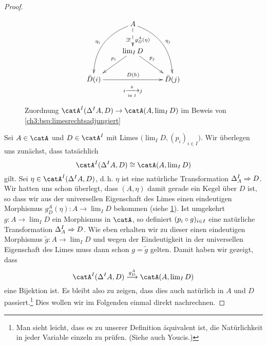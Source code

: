 \begin{proof}
    \let\origlim=\lim
    \renewcommand{\lim}{\origlim\nolimits}
    \begin{figure}
        \centering
        \begin{equation*}
                \xymatrix{
                    & \ar@/_1.5pc/[ddl]_{\eta_i} 
                    A \ar@/^1.5pc/[ddr]^{\eta_j} 
                    \ar@{-->}[d]_(.57){\exists!}^(.57){g_D^A(\eta)} &
                    \\
                    & \ar[dl]_(.4){p_i} \lim_I D 
                      \ar[dr]^(.4){p_j} &
                    \\
                    \bar D(i) \ar[rr]^{D(h)}
                    \ar@{}@<-16pt>[rr]|-{i \xrightarrow[\text{in $I$}]{h} j}
                    & & \bar D(j)
                }
        \end{equation*}
        \caption{Zuordnung $\catA^I(\Delta^I A, D) \to \catA(A,\lim_I D)$ im
            Beweis von \cref{ch3:bsp:limesrechtsadjungiert}}
        \label{ch3:fig:nattrafozumorphismus}
    \end{figure}
    Sei $A\in\catA$ und $D\in\catA^I$ mit Limes $\bigl(\lim_I D,(p_i)_{i\in I}\bigr)$.
    Wir überlegen uns zunächst, dass tatsächlich
    \[ \catA^I(\Delta^I A, D) \cong \catA(A,\lim_I D) \]
    gilt. Sei $\eta\in\catA^I(\Delta^I A, D)$, d.\,h. $\eta$ ist eine natürliche
    Transformation $\Delta^I_A\mathrel{\Rightarrow} D$. Wir hatten uns schon überlegt,
    dass $(A,\eta)$ damit gerade ein Kegel über $D$ ist, so dass wir aus der
    universellen Eigenschaft des Limes einen eindeutigen Morphismus
    $g_D^A(\eta)\colon A\to \lim_I D$ bekommen (siehe
    \cref{ch3:fig:nattrafozumorphismus}). Ist umgekehrt $g\colon A\to \lim_I D$
    ein Morphismus in $\catA$, so definiert $(p_i\after g)_{i\in I}$ eine
    natürliche Transformation $\Delta^I_A \mathrel{\Rightarrow} D$. Wie eben erhalten wir
    zu dieser einen eindeutigen Morphismus  $\tilde g\colon A\to\lim_I D$ und
    wegen der Eindeutigkeit in der universellen Eigenschaft des Limes muss dann
    schon $g=\tilde g$ gelten. Damit haben wir gezeigt, dass
    \[ \catA^I(\Delta^I A, D) \overset{g_D^A}\longto \catA(A,\lim_I D) \]
    eine Bijektion ist. Es bleibt also zu zeigen, dass dies auch natürlich in
    $A$ und $D$ passiert.\footnote{Man sieht leicht, dass es zu unserer
        Definition äquivalent ist, die Natürlichkeit in jeder Variable einzeln
        zu prüfen. (Siehe auch Youcis\cite{www:an:youcis:productcat2}.)%
    }
    Dies wollen wir im Folgenden einmal direkt nachrechnen.
    

\end{proof}

